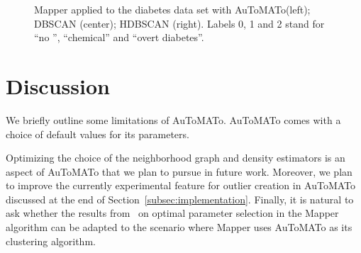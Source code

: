 \documentclass[10pt]{article} %
\theoremstyle{plain}
\newcommand{\aut}{AuToMATo\xspace}
\begin{document}
\begin{figure}[ht]
    \centering
    \begin{subfigure}{0.25\textwidth}
        \centering
        
        \label{fig:mapper_diabetes_automato_4_intervals_0.5_overlap}
    \end{subfigure}
    \hfill
    \begin{subfigure}{0.25\textwidth}
        \centering
        
        \label{fig:mapper_diabetes_dbscan_4_intervals_0.5_overlap}
    \end{subfigure}
    \hfill
    \begin{subfigure}{0.25\textwidth}
        \centering
        
    \label{fig:mapper_diabetes_hdbscan_4_intervals_0.5_overlap}
    \end{subfigure}
    \caption{Mapper applied to the diabetes data set with \aut (left); DBSCAN (center); HDBSCAN (right). Labels 0, 1 and 2 stand for ``no '', ``chemical'' and ``overt diabetes''.}
    \label{fig:mapper_diabetes}
\end{figure}


\section{Discussion}\label{sec:discussion}

We briefly outline some limitations of \aut.
\aut comes with a choice of default values for its parameters. 

Optimizing the choice of the neighborhood graph and density estimators is an aspect of \aut that we plan to pursue in future work. Moreover, we plan to improve the currently experimental feature for outlier creation in \aut discussed at the end of Section~\ref{subsec:implementation}. Finally, it is natural to ask whether the results from~\citet{mapper_parameter_selection_carriere} on optimal parameter selection in the Mapper algorithm can be adapted to the scenario where Mapper uses \aut as its clustering algorithm.

\end{document}
